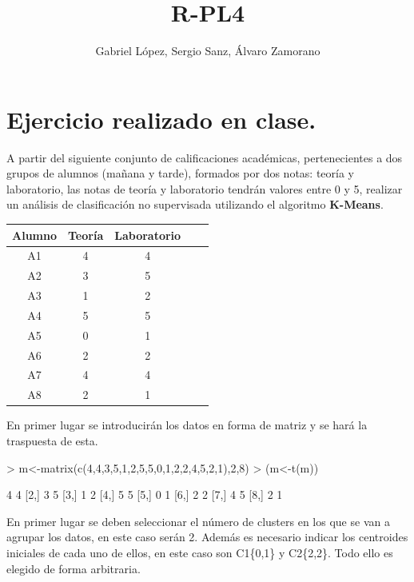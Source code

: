 \documentclass [a4paper] {article}
\title{R-PL4}
\author{Gabriel López, Sergio Sanz, Álvaro Zamorano}
\begin{document}


\maketitle

\graphicspath{ {./tmp/} }

\section{Ejercicio realizado en clase.}

\bigskip
A partir del siguiente conjunto de calificaciones académicas, pertenecientes a dos grupos de alumnos (mañana y tarde),
formados por dos notas: teoría y laboratorio, las notas de teoría y laboratorio tendrán valores entre 0 y 5, realizar
un análisis de clasificación no supervisada utilizando el algoritmo \textbf{K-Means}.

\begin{table}[H]
\begin{center}
\begin{tabular}{|c|c|c|c|c|}
\hline
Alumno & Teoría & Laboratorio\\
\hline \hline
A1 & 4 & 4 \\ \hline
A2 & 3 & 5 \\ \hline
A3 & 1 & 2 \\ \hline
A4 & 5 & 5 \\ \hline
A5 & 0 & 1 \\ \hline
A6 & 2 & 2 \\ \hline
A7 & 4 & 4 \\ \hline
A8 & 2 & 1 \\ \hline
\end{tabular}
\end{center}
\end{table}

En primer lugar se introducirán los datos en forma de matriz y se hará la traspuesta de esta.
\begin{Schunk}
\begin{Sinput}
> m<-matrix(c(4,4,3,5,1,2,5,5,0,1,2,2,4,5,2,1),2,8)
> (m<-t(m))
\end{Sinput}
\begin{Soutput}
     [,1] [,2]
[1,]    4    4
[2,]    3    5
[3,]    1    2
[4,]    5    5
[5,]    0    1
[6,]    2    2
[7,]    4    5
[8,]    2    1
\end{Soutput}
\end{Schunk}

\bigskip
En primer lugar se deben seleccionar el número de clusters en los que se van a agrupar los datos,
en este caso serán 2. Además es necesario indicar los centroides iniciales de cada uno de ellos, en
este caso son C1\{0,1\} y C2\{2,2\}. Todo ello es elegido de forma arbitraria.
\end{document}
